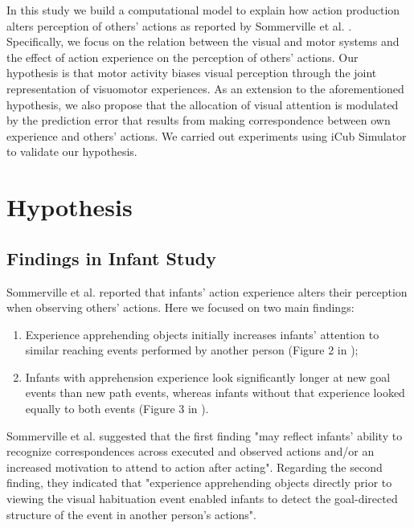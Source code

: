 \documentclass[conference]{IEEEtran}
\begin{document}
In this study we build a computational model to explain how action production alters perception of others’ actions as reported by Sommerville et al. \cite{sommerville2005action}. Specifically, we focus on the relation between the visual and motor systems and the effect of action experience on the perception of others' actions. Our hypothesis is that motor activity biases visual perception through the joint representation of visuomotor experiences. As an extension to the aforementioned hypothesis, we also propose that the allocation of visual attention is modulated by the prediction error that results from making correspondence between own experience and others' actions. We carried out experiments using iCub Simulator to validate our hypothesis.

\section{Hypothesis}
 
\subsection{Findings in Infant Study}
Sommerville et al. \cite{sommerville2005action} reported that infants' action experience alters their perception when observing others' actions. Here we focused on two main findings:
 
\begin{enumerate}
\item Experience apprehending objects initially increases infants' attention to similar reaching events performed by another person (Figure 2 in \cite{sommerville2005action});
\item Infants with apprehension experience look significantly longer at new goal events than new path events, whereas infants without that experience looked equally to both events (Figure 3 in \cite{sommerville2005action}).
\end{enumerate}
 
Sommerville et al. \cite{sommerville2005action} suggested that the first finding "may reflect infants’ ability to recognize correspondences across executed and observed actions and/or an increased motivation to attend to action after acting". Regarding the second finding, they indicated that "experience apprehending objects directly prior to viewing the visual habituation event enabled infants to detect the goal-directed structure of the event in another person's actions".
\end{document}
